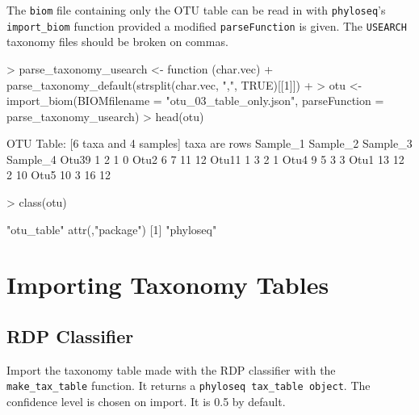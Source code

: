 \documentclass{article}
\begin{document}
The \texttt{biom} file containing only the OTU table can be read in with \texttt{phyloseq}'s \texttt{import\_biom} function provided a modified \texttt{parseFunction} is given. The \texttt{USEARCH} taxonomy files should be broken on commas.    

\begin{Schunk}
\begin{Sinput}
> parse_taxonomy_usearch <- function (char.vec){
+   parse_taxonomy_default(strsplit(char.vec, ",", TRUE)[[1]])
+ }
> otu <- import_biom(BIOMfilename = "otu_03_table_only.json", parseFunction = parse_taxonomy_usearch)
> head(otu)
\end{Sinput}
\begin{Soutput}
OTU Table:          [6 taxa and 4 samples]
                     taxa are rows
      Sample_1 Sample_2 Sample_3 Sample_4
Otu39        1        2        1        0
Otu2         6        7       11       12
Otu11        1        3        2        1
Otu4         9        5        3        3
Otu1        13       12        2       10
Otu5        10        3       16       12
\end{Soutput}
\begin{Sinput}
> class(otu)
\end{Sinput}
\begin{Soutput}
[1] "otu_table"
attr(,"package")
[1] "phyloseq"
\end{Soutput}
\end{Schunk}

\section*{Importing Taxonomy Tables}

\subsection*{RDP Classifier}

Import the taxonomy table made with the RDP classifier with the \texttt{make\_tax\_table} function. It returns a \texttt{phyloseq tax\_table object}. The confidence level is chosen on import. It is 0.5 by default.    
\end{document}
